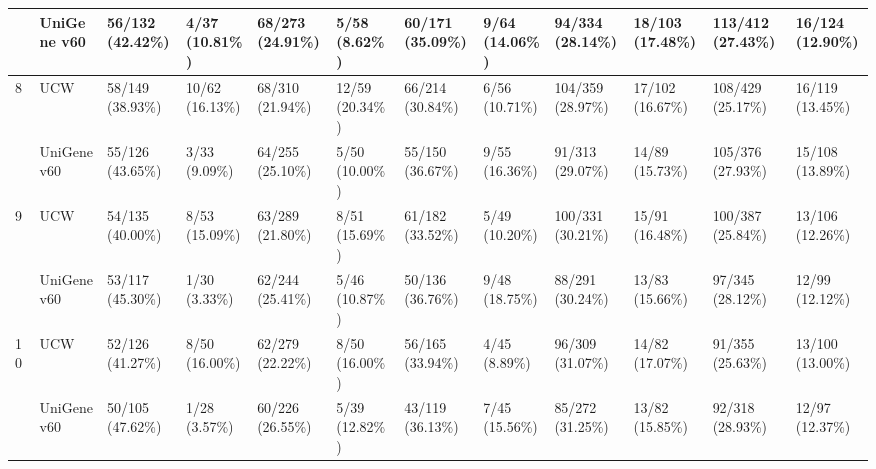 \begin{sidewaystable}
\begin{localsize}{6}{7}
\begin{tabular}{llp{1cm}p{1cm}p{1cm}p{1cm}p{1cm}p{1cm}p{1cm}p{1cm}p{1cm}p{1cm}}
            & UniGene v60 & 56/132 (42.42\%)   & 4/37 (10.81\%)     & 68/273 (24.91\%)    & 5/58    (8.62\%)    & 60/171 (35.09\%)    & 9/64 (14.06\%)      & 94/334 (28.14\%)    & 18/103 (17.48\%)    & 113/412 (27.43\%)          & 16/124 (12.90\%)          \\
 \midrule
 8          & UCW         & 58/149 (38.93\%)   & 10/62 (16.13\%)    & 68/310 (21.94\%)    & 12/59 (20.34\%)     & 66/214 (30.84\%)    & 6/56 (10.71\%)      & 104/359 (28.97\%)   & 17/102 (16.67\%)    & 108/429 (25.17\%)          & 16/119 (13.45\%)          \\
            & UniGene v60 & 55/126 (43.65\%)   & 3/33    (9.09\%)   & 64/255 (25.10\%)    & 5/50 (10.00\%)      & 55/150 (36.67\%)    & 9/55 (16.36\%)      & 91/313 (29.07\%)    & 14/89 (15.73\%)     & 105/376 (27.93\%)          & 15/108 (13.89\%)          \\
 \midrule
 9          & UCW         & 54/135 (40.00\%)   & 8/53 (15.09\%)     & 63/289 (21.80\%)    & 8/51 (15.69\%)      & 61/182 (33.52\%)    & 5/49 (10.20\%)      & 100/331 (30.21\%)   & 15/91 (16.48\%)     & 100/387 (25.84\%)          & 13/106 (12.26\%)          \\
            & UniGene v60 & 53/117 (45.30\%)   & 1/30    (3.33\%)   & 62/244 (25.41\%)    & 5/46 (10.87\%)      & 50/136 (36.76\%)    & 9/48 (18.75\%)      & 88/291 (30.24\%)    & 13/83 (15.66\%)     & 97/345 (28.12\%)           & 12/99 (12.12\%)           \\
 \midrule
 10         & UCW         & 52/126 (41.27\%)   & 8/50 (16.00\%)     & 62/279 (22.22\%)    & 8/50 (16.00\%)      & 56/165 (33.94\%)    & 4/45    (8.89\%)    & 96/309 (31.07\%)    & 14/82 (17.07\%)     & 91/355 (25.63\%)           & 13/100 (13.00\%)          \\
            & UniGene v60 & 50/105 (47.62\%)   & 1/28    (3.57\%)   & 60/226 (26.55\%)    & 5/39 (12.82\%)      & 43/119 (36.13\%)    & 7/45 (15.56\%)      & 85/272 (31.25\%)    & 13/82 (15.85\%)     & 92/318 (28.93\%)           & 12/97 (12.37\%)           \\
\bottomrule
\end{tabular}
\end{localsize}
\end{sidewaystable}
